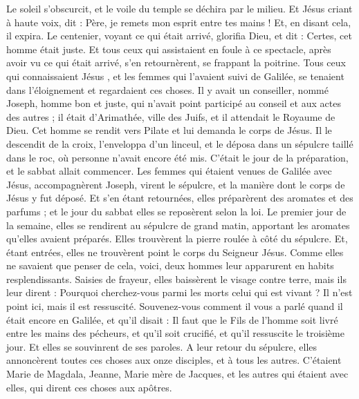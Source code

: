 \begin{multicols}{2}
{Le soleil s’obscurcit, et le voile du temple se déchira par le milieu.
Et Jésus criant à haute voix, dit : Père, je remets mon esprit entre tes mains ! Et, en disant cela, il expira.
Le centenier, voyant ce qui était arrivé, glorifia Dieu, et dit : Certes, cet homme était juste.
Et tous ceux qui assistaient en foule à ce spectacle, après avoir vu ce qui était arrivé, s'en retournèrent, se frappant la poitrine.
Tous ceux qui connaissaient Jésus , et les femmes qui l'avaient suivi de Galilée, se tenaient dans l’éloignement et regardaient ces choses.
Il y avait un conseiller, nommé Joseph, homme bon et juste,
qui n'avait point participé au conseil et aux actes des autres ; il était d'Arimathée, ville des Juifs, et il attendait le Royaume de Dieu.
Cet homme se rendit vers Pilate et lui demanda le corps de Jésus.
Il le descendit de la croix, l'enveloppa d’un linceul, et le déposa dans un sépulcre taillé dans le roc, où personne n'avait encore été mis.
C’était le jour de la préparation, et le sabbat allait commencer.
Les femmes qui étaient venues de Galilée avec Jésus, accompagnèrent Joseph, virent le sépulcre, et la manière dont le corps de Jésus y fut déposé.
Et s'en étant retournées, elles préparèrent des aromates et des parfums ; et le jour du sabbat elles se reposèrent selon la loi.
\VerseOne{}Le premier jour de la semaine, elles se rendirent au sépulcre de grand matin, apportant les aromates qu'elles avaient préparés.
Elles trouvèrent la pierre roulée à côté du sépulcre.
Et, étant entrées, elles ne trouvèrent point le corps du Seigneur Jésus.
Comme elles ne savaient que penser de cela, voici, deux hommes leur apparurent en habits resplendissants.
Saisies de frayeur, elles baissèrent le visage contre terre, mais ils leur dirent : Pourquoi cherchez-vous parmi les morts celui qui est vivant ?
Il n'est point ici, mais il est ressuscité. Souvenez-vous comment il vous a parlé quand il était encore en Galilée,
et qu’il disait : Il faut que le Fils de l'homme soit livré entre les mains des pécheurs, et qu'il soit crucifié, et qu'il ressuscite le troisième jour.
Et elles se souvinrent de ses paroles.
A leur retour du sépulcre, elles annoncèrent toutes ces choses aux onze disciples, et à tous les autres.
C’étaient Marie de Magdala, Jeanne, Marie mère de Jacques, et les autres qui étaient avec elles, qui dirent ces choses aux apôtres.
}
\end{multicols}
